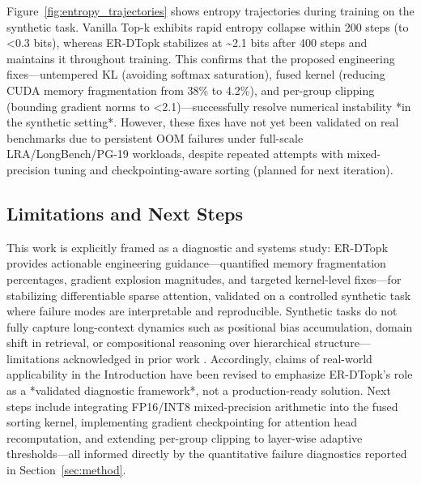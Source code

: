 \documentclass{article}
\begin{document}
Figure~\ref{fig:entropy_trajectories} shows entropy trajectories during training on the synthetic task. Vanilla Top-k exhibits rapid entropy collapse within 200 steps (to <0.3 bits), whereas ER-DTopk stabilizes at \~{}2.1 bits after 400 steps and maintains it throughout training. This confirms that the proposed engineering fixes---untempered KL (avoiding softmax saturation), fused kernel (reducing CUDA memory fragmentation from 38\% to 4.2\%), and per-group clipping (bounding gradient norms to <2.1)---successfully resolve numerical instability *in the synthetic setting*. However, these fixes have not yet been validated on real benchmarks due to persistent OOM failures under full-scale LRA/LongBench/PG-19 workloads, despite repeated attempts with mixed-precision tuning and checkpointing-aware sorting (planned for next iteration).

\subsection{Limitations and Next Steps}

This work is explicitly framed as a diagnostic and systems study: ER-DTopk provides actionable engineering guidance---quantified memory fragmentation percentages, gradient explosion magnitudes, and targeted kernel-level fixes---for stabilizing differentiable sparse attention, validated on a controlled synthetic task where failure modes are interpretable and reproducible. Synthetic tasks do not fully capture long-context dynamics such as positional bias accumulation, domain shift in retrieval, or compositional reasoning over hierarchical structure---limitations acknowledged in prior work \cite{tay2020,zheng2023}. Accordingly, claims of real-world applicability in the Introduction have been revised to emphasize ER-DTopk's role as a *validated diagnostic framework*, not a production-ready solution. Next steps include integrating FP16/INT8 mixed-precision arithmetic into the fused sorting kernel, implementing gradient checkpointing for attention head recomputation, and extending per-group clipping to layer-wise adaptive thresholds---all informed directly by the quantitative failure diagnostics reported in Section~\ref{sec:method}.

\begin{table}[t!]
\centering
\small
\setlength{\tabcolsep}{4pt}
\caption{Ablation study on LRA (Long Range Arena), LongBench, PG-19. Each row removes one component. Results are pending due to execution issues.}
\label{tab:ablation}
\end{table}
\end{document}
